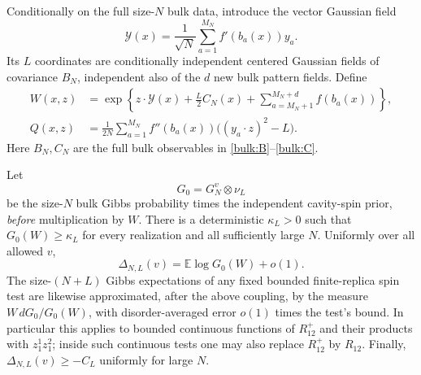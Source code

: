 Conditionally on the full size-$N$ bulk data, introduce the vector
Gaussian field
\begin{equation}\label{cav:linear-field}
 \mathcal Y(x)=\frac1{\sqrt N}\sum_{a=1}^{M_N} f'(b_a(x))y_a.
\end{equation}
Its $L$ coordinates are conditionally independent centered Gaussian
fields of covariance $B_N$, independent also of the $d$ new bulk
pattern fields.  Define
\begin{align}
 W(x,z)&=\exp\left\{z\cdot\mathcal Y(x)+\frac L2C_N(x)
                   +\sum_{a=M_N+1}^{M_N+d}f(b_a(x))\right\},
 \label{cav:W}\\
 Q(x,z)&=\frac1{2N}\sum_{a=1}^{M_N} f''(b_a(x))
                      \bigl((y_a\cdot z)^2-L\bigr).
 \label{cav:Q}
\end{align}
Here $B_N,C_N$ are the full bulk observables in
\eqref{bulk:B}--\eqref{bulk:C}.

\begin{lemma}
\label{cav:finite-comparison}
Let
\begin{equation}\label{cav:untilted-base}
 G_0=G_N^v\otimes\nu_L
\end{equation}
be the size-$N$ bulk Gibbs probability times the independent cavity-spin
prior, \emph{before} multiplication by $W$.  There is a deterministic
$\kappa_L>0$ such that $G_0(W)\ge\kappa_L$ for every realization and
all sufficiently large $N$.  Uniformly over all allowed $v$,
\begin{equation}\label{cav:finite-increment}
 \Delta_{N,L}(v)=\mathbb E\log G_0(W)+o(1).
\end{equation}
The size-$(N+L)$ Gibbs expectations of any fixed bounded
finite-replica spin test are likewise approximated, after the above
coupling, by the measure $W\,dG_0/G_0(W)$, with disorder-averaged error
$o(1)$ times the test's bound.  In particular this applies to bounded
continuous functions of $R^+_{12}$ and their products with $z_1^1z_1^2$;
inside such continuous tests one may also replace $R^+_{12}$ by $R_{12}$.
Finally, $\Delta_{N,L}(v)\ge-C_L$ uniformly for large $N$.
\end{lemma}

